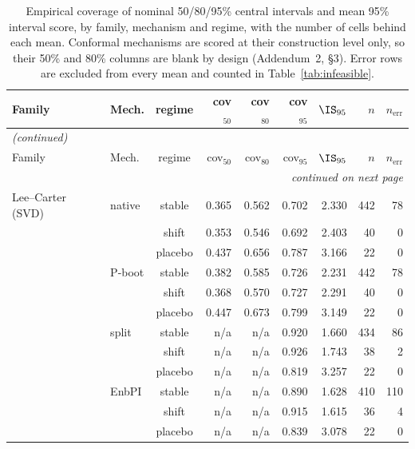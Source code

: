 {\footnotesize\setlength{\tabcolsep}{2.5pt}
\begin{longtable}{@{}llcrrrrrr@{}}
\caption{Empirical coverage of nominal 50/80/95\% central intervals and mean 95\% interval score, by family, mechanism and regime, with the number of cells behind each mean. Conformal mechanisms are scored at their construction level only, so their 50\% and 80\% columns are blank by design (Addendum~2, \S3). Error rows are excluded from every mean and counted in Table~\ref{tab:infeasible}.}\label{tab:h2-coverage} \\
\toprule
Family & Mech. & regime & cov$_{50}$ & cov$_{80}$ & cov$_{95}$ & $\IS_{95}$ & $n$ & $n_{\mathrm{err}}$ \\
\midrule
\endfirsthead
\multicolumn{9}{l}{\emph{(continued)}} \\
\toprule
Family & Mech. & regime & cov$_{50}$ & cov$_{80}$ & cov$_{95}$ & $\IS_{95}$ & $n$ & $n_{\mathrm{err}}$ \\
\midrule
\endhead
\midrule \multicolumn{9}{r}{\emph{continued on next page}} \\
\endfoot
\bottomrule
\endlastfoot
Lee--Carter (SVD) & native & stable & 0.365 & 0.562 & 0.702 & 2.330 & 442 & 78 \\
 &  & shift & 0.353 & 0.546 & 0.692 & 2.403 & 40 & 0 \\
 &  & placebo & 0.437 & 0.656 & 0.787 & 3.166 & 22 & 0 \\
 & P-boot & stable & 0.382 & 0.585 & 0.726 & 2.231 & 442 & 78 \\
 &  & shift & 0.368 & 0.570 & 0.727 & 2.291 & 40 & 0 \\
 &  & placebo & 0.447 & 0.673 & 0.799 & 3.149 & 22 & 0 \\
 & split & stable & n/a & n/a & 0.920 & 1.660 & 434 & 86 \\
 &  & shift & n/a & n/a & 0.926 & 1.743 & 38 & 2 \\
 &  & placebo & n/a & n/a & 0.819 & 3.257 & 22 & 0 \\
 & EnbPI & stable & n/a & n/a & 0.890 & 1.628 & 410 & 110 \\
 &  & shift & n/a & n/a & 0.915 & 1.615 & 36 & 4 \\
 &  & placebo & n/a & n/a & 0.839 & 3.078 & 22 & 0 \\

\end{longtable}}
